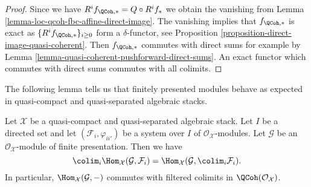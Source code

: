 \begin{proof}
Since we have $R^if_{\QCoh, *} = Q \circ R^if_*$ we obtain the
vanishing from Lemma \ref{lemma-loc-qcoh-fbc-affine-direct-image}.
The vanishing implies that $f_{\QCoh, *}$ is exact as
$\{R^if_{\QCoh, *}\}_{i \geq 0}$ form a $\delta$-functor, see
Proposition \ref{proposition-direct-image-quasi-coherent}.
Then $f_{\QCoh, *}$ commutes with direct sums for example by
Lemma \ref{lemma-quasi-coherent-pushforward-direct-sums}.
An exact functor which commutes with direct sums commutes
with all colimits.
\end{proof}

\noindent
The following lemma tells us that finitely presented modules behave
as expected in quasi-compact and quasi-separated algebraic stacks.

\begin{lemma}
\label{lemma-finite-presentation-quasi-compact-colimit}
Let $\mathcal{X}$ be a quasi-compact and quasi-separated algebraic stack.
Let $I$ be a directed set and let $(\mathcal{F}_i, \varphi_{ii'})$ be a
system over $I$ of $\mathcal{O}_\mathcal{X}$-modules. Let $\mathcal{G}$ be an
$\mathcal{O}_\mathcal{X}$-module of finite presentation. Then we have
$$
\colim_i \Hom_\mathcal{X}(\mathcal{G}, \mathcal{F}_i)
=
\Hom_\mathcal{X}(\mathcal{G}, \colim_i \mathcal{F}_i).
$$
In particular, $\Hom_\mathcal{X}(\mathcal{G}, -)$ commutes with filtered
colimits in $\QCoh(\mathcal{O}_\mathcal{X})$.
\end{lemma}

